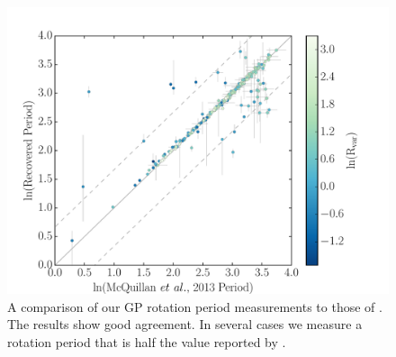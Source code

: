 \documentclass[useAMS, usenatbib, preprint, 12pt]{aastex}
\newcommand{\Kepler}{{\it Kepler}}
\newcommand{\kepler}{\Kepler}
\begin{document}
\begin{figure}
\begin{center}
\includegraphics[width=6in, clip=true]{figures/comparison_koi.pdf}
\caption[Comparison with McQuillan results.]
{A comparison of our GP rotation period measurements to those of
\citet{Mcquillan2014}. The results show good agreement. In several cases we
    measure a rotation period that is half the value reported by
    \citet{Mcquillan2014}.}
\label{fig:mcquillan}
\end{center}
\end{figure}

\end{document}
